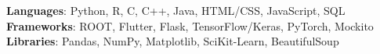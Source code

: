    \begin{itemize}[leftmargin=0.15in, label={}] 
    \small{\item{
      \textbf{Languages}: Python, R, C, C++, Java, HTML/CSS, JavaScript, SQL\\
      \textbf{Frameworks}: ROOT, Flutter, Flask, TensorFlow/Keras, PyTorch, Mockito\\
      \textbf{Libraries}: Pandas, NumPy, Matplotlib, SciKit-Learn, BeautifulSoup
       }}
\end{itemize}